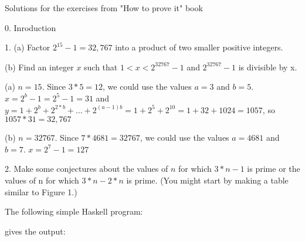 \documentclass{article}
\begin{document}
\vspace*{\fill}
\centerline{\sc \large Solutions for the exercises from "How to prove it" book }
\vspace*{\fill}
%
\pagebreak
\centerline{\sc \large 0. Inroduction}
\vspace{50pt}

1. (a) Factor $2^{15} - 1 = 32,767$ into a product of two smaller positive integers.

\hspace{12pt}(b) Find an integer $x$ such that $1 < x < 2^{32767} − 1$ and $2^{32767} - 1$ is divisible by x.
\vspace{20pt}


(a) $n = 15$. Since $3 * 5 = 12$, we could use the values $a = 3$ and $b = 5$.
$x = 2^b - 1 = 2^5 - 1 = 31$ and $y = 1 + 2^b + 2^{2*b} + \dotso + 2^{(a-1)b} = 1 + 2^5 + 2^{10} = 1 + 32 + 1024 = 1057$,
so $1057 * 31 = 32,767$
\vspace{10pt}

(b) $n=32767$. Since $7 * 4681 = 32767$, we could use the values $a = 4681$ and $b = 7$.
$x = 2^7 - 1 = 127$
\vspace{40pt}

2. Make some conjectures about the values of $n$ for which $3*n - 1$ is prime or
the values of n for which $3*n - 2*n$ is prime. (You might start by making a
table similar to Figure 1.)
\vspace{20pt}

The following simple Haskell program:

gives the output:
\end{document}
